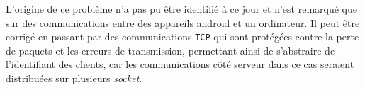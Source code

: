L'origine de ce problème n'a pas pu être identifié à ce jour et n'est remarqué que sur des communications entre des appareils android et un ordinateur.
Il peut être corrigé en passant par des communications \verb!TCP! qui sont protégées contre la perte de paquets et les erreurs de transmission, permettant ainsi de s'abstraire de l'identifiant des clients, car les communications côté serveur dans ce cas seraient distribuées sur plusieurs \textit{socket}.
